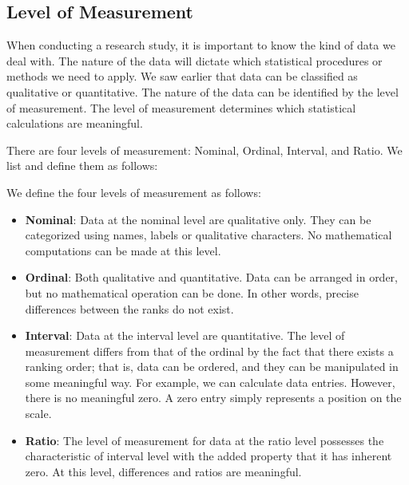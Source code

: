 \subsection{Level of Measurement}

When conducting a research study, it is important to know the kind of data we deal with. The nature of the data will dictate which statistical procedures or methods we need to apply. We saw earlier that data can be classified as qualitative or quantitative. The nature of the data can be identified by the level of measurement. The level of measurement determines which statistical calculations are meaningful. 

There are four levels of measurement: Nominal, Ordinal, Interval, and Ratio. We list and define them as follows: 

\begin{definition} We define the four levels of measurement as follows: 
\begin{itemize}
   \item {\textbf{Nominal}}: Data at the nominal level are qualitative only. They can be categorized using names, labels or qualitative characters. No mathematical computations can be made at this level.
   \item {\textbf{Ordinal}}: Both qualitative and quantitative. Data can be arranged in order, but no mathematical operation can be done. In other words, precise differences between the ranks do not exist.
   \item {\textbf{Interval}}: Data at the interval level are quantitative. The level of measurement differs from that of the ordinal by the fact that there exists a ranking order; that is, data can be ordered, and they can be manipulated in some meaningful way. For example, we can calculate data entries. However, there is no meaningful zero. A zero entry simply represents a position on the scale. 
   \item {\textbf{Ratio}}: The level of measurement for data at the ratio level possesses the characteristic of interval level with the added property that it has inherent zero. At this level, differences and ratios are meaningful. 
\end{itemize}
\end{definition} 
 
